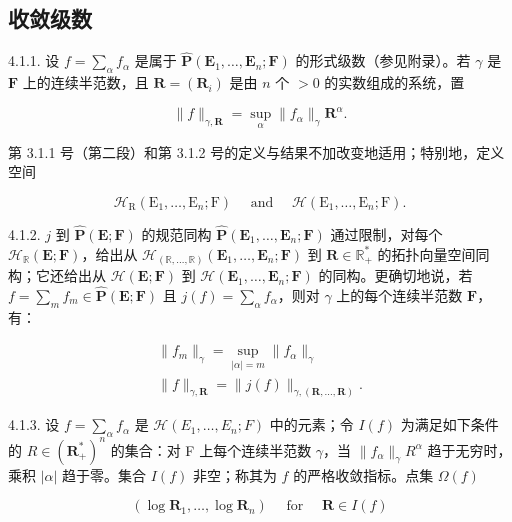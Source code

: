 \subsection{收敛级数}

4.1.1. 设 \(f = \sum_{\alpha} f_{\alpha}\) 是属于 \(\hat{\mathbf{P}}(\mathbf{E}_1, \ldots, \mathbf{E}_n; \mathbf{F})\) 的形式级数（参见附录）。若 \(\gamma\) 是 \(\mathbf{F}\) 上的连续半范数，且 \(\mathbf{R} = (\mathbf{R}_i)\) 是由 \(n\) 个 \(>0\) 的实数组成的系统，置

\[
\| f \| _ {\gamma , \mathbf {R}} = \sup _ {\alpha} \| f _ {\alpha} \| _ {\gamma} \mathbf {R} ^ {\alpha}.
\]

第 3.1.1 号（第二段）和第 3.1.2 号的定义与结果不加改变地适用；特别地，定义空间

\[
\mathcal {H} _ {\mathrm{R}} (\mathrm{E} _ {1}, \dots , \mathrm{E} _ {n}; \mathrm{F}) \quad \text { and } \quad \mathcal {H} (\mathrm{E} _ {1}, \dots , \mathrm{E} _ {n}; \mathrm{F}).
\]

4.1.2. \(j\) 到 \(\hat{\mathbf{P}}(\mathbf{E};\mathbf{F})\) 的规范同构 \(\hat{\mathbf{P}}(\mathbf{E}_{1},\ldots,\mathbf{E}_{n};\mathbf{F})\) 通过限制，对每个 \(\mathcal{H}_{\mathbb{R}}(\mathbf{E};\mathbf{F})\)，给出从 \(\mathcal{H}_{(\mathbb{R},\ldots,\mathbb{R})}(\mathbf{E}_{1},\ldots,\mathbf{E}_{n};\mathbf{F})\) 到 \(\mathbf{R}\in\mathbb{R}_{+}^{*}\) 的拓扑向量空间同构；它还给出从 \(\mathcal{H}(\mathbf{E};\mathbf{F})\) 到 \(\mathcal{H}(\mathbf{E}_{1},\ldots,\mathbf{E}_{n};\mathbf{F})\) 的同构。更确切地说，若 \(f=\sum_{m}f_{m}\in\hat{\mathbf{P}}(\mathbf{E};\mathbf{F})\) 且 \(j(f)=\sum_{\alpha}f_{\alpha}\)，则对 \(\gamma\) 上的每个连续半范数 \(\mathbf{F}\)，有：

\[
\begin{array}{l} \| f _ {m} \| _ {\gamma} = \sup _ {| \alpha | = m} \| f _ {\alpha} \| _ {\gamma} \\ \| f \| _ {\gamma , \mathbf {R}} = \| j (f) \| _ {\gamma , (\mathbf {R}, \dots , \mathbf {R})}. \end{array}
\]

4.1.3. 设 \(f = \sum_{\alpha} f_{\alpha}\) 是 \(\mathcal{H}(E_1, \ldots, E_n; F)\) 中的元素；令 \(I(f)\) 为满足如下条件的 \(R \in (\mathbf{R}_+^*)^n\) 的集合：对 F 上每个连续半范数 \(\gamma\)，当 \(\|f_{\alpha}\|_{\gamma} R^{\alpha}\) 趋于无穷时，乘积 \(|\alpha|\) 趋于零。集合 \(I(f)\) 非空；称其为 \(f\) 的严格收敛指标。点集 \(\Omega(f)\)

\[
(\log \mathbf {R} _ {1}, \dots , \log \mathbf {R} _ {n}) \quad \text { for } \quad \mathbf {R} \in I (f)
\]

